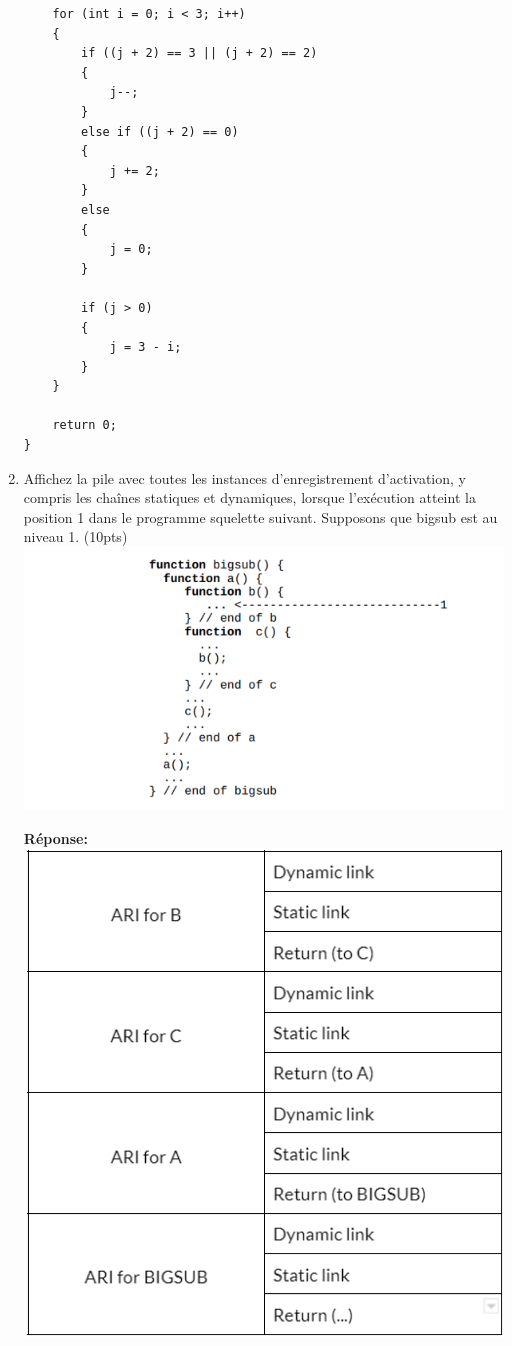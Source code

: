 \documentclass[12pt]{book}
\begin{document}
\begin{enumerate}
\begin{verbatim}
    for (int i = 0; i < 3; i++) 
    {
        if ((j + 2) == 3 || (j + 2) == 2) 
        {
            j--;
        }
        else if ((j + 2) == 0) 
        {
            j += 2;
        }
        else
        {
            j = 0;
        }
        
        if (j > 0)
        {
            j = 3 - i;
        }
    }
   
    return 0;
}

\end{verbatim}

\newpage
    \item Affichez la pile avec toutes les instances d'enregistrement d'activation, y compris les chaînes statiques et dynamiques, lorsque l'exécution atteint la position 1 dans le programme squelette suivant. Supposons que bigsub est au niveau 1. (10pts)\\
    
    \includegraphics[scale=1]{D4_Q3_question.png}


\textbf{Réponse:}\\

    \includegraphics[scale=1]{D4_Q3_answer.png}


\end{enumerate}
\end{document}
